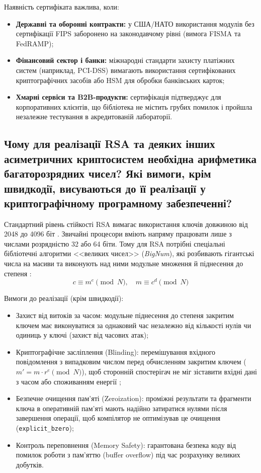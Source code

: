 Наявність сертифіката важлива, коли:
\begin{itemize}
    \item \textbf{Державні та оборонні контракти:} у США/НАТО використання модулів без сертифікації FIPS заборонено на законодавчому рівні (вимога FISMA та FedRAMP);
    \item \textbf{Фінансовий сектор і банки:} міжнародні стандарти захисту платіжних систем (наприклад, PCI-DSS) вимагають використання сертифікованих криптографічних засобів або HSM для обробки банківських карток;
    \item \textbf{Хмарні сервіси та B2B-продукти:} сертифікація підтверджує для корпоративних клієнтів, що бібліотека не містить грубих помилок і пройшла незалежне тестування в акредитованій лабораторії.
\end{itemize} 


\subsection{Чому для реалізації RSA та деяких інших асиметричних криптосистем необхідна арифметика багаторозрядних чисел? Які вимоги, крім швидкодії, висуваються до її реалізації у криптографічному програмному забезпеченні?}

Стандартний рівень стійкості RSA вимагає використання ключів довжиною від 2048 до 4096 біт \cite{SP800-57}. Звичайні процесори вміють напряму працювати лише з числами розрядністю 32 або 64 біти. Тому для RSA потрібні спеціальні бібліотечні алгоритми <<великих чисел>> (\textit{BigNum}), які розбивають гігантські числа на масиви та виконують над ними модульне множення й піднесення до степеня \cite{RFC8017}:
\begin{equation}
c \equiv m^e \pmod{N}, \quad m \equiv c^d \pmod{N}
\end{equation}

Вимоги до реалізації (крім швидкодії):
\begin{itemize}
    \item Захист від витоків за часом: модульне піднесення до степеня закритим ключем має виконуватися за однаковий час незалежно від кількості нулів чи одиниць у ключі (захист від часових атак);
    \item Криптографічне засліплення (Blinding): перемішування вхідного повідомлення з випадковим числом перед обчисленням закритим ключем ($m' = m \cdot r^e \pmod{N}$), щоб сторонній спостерігач не міг зіставити вхідні дані з часом або споживанням енергії \cite{RFC8017};
    \item Безпечне очищення пам'яті (Zeroization): проміжні результати та фрагменти ключа в оперативній пам'яті мають надійно затиратися нулями після завершення операції, щоб компілятор не оптимізував це очищення (\texttt{explicit\_bzero});
    \item Контроль переповнення (Memory Safety): гарантована безпека коду від помилок роботи з пам'яттю (buffer overflow) під час розрахунку великих добутків.
\end{itemize}
